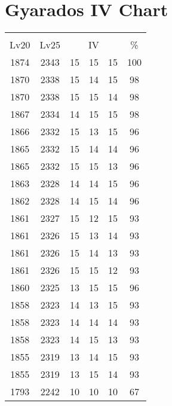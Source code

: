 \documentclass{article}%
\begin{document}
%
\normalsize%
\section{Gyarados IV Chart}%
\label{sec:Gyarados IV Chart}%
\renewcommand{\arraystretch}{1.5}%
\begin{tabular}{|c|c|c|c|c|c|}%
\hline%
\multicolumn{6}{|c|}{\textcolor{white}{ 
\linebreak{Gyarados}
}%
\cellcolor{black}}\\%
\multicolumn{1}{|c}{Lv20}&\multicolumn{1}{c|}{Lv25}&\multicolumn{3}{c|}{IV}&\multicolumn{1}{|c|}{\%}\\%
\hline%
\rowcolor{color100}%
1874&2343&15&15&15&100\\%
\hline%
\rowcolor{color98}%
1870&2338&15&14&15&98\\%
\hline%
\rowcolor{color98}%
1870&2338&15&15&14&98\\%
\hline%
\rowcolor{color98}%
1867&2334&14&15&15&98\\%
\hline%
\rowcolor{color96}%
1866&2332&15&13&15&96\\%
\hline%
\rowcolor{color96}%
1865&2332&15&14&14&96\\%
\hline%
\rowcolor{color96}%
1865&2332&15&15&13&96\\%
\hline%
\rowcolor{color96}%
1863&2328&14&14&15&96\\%
\hline%
\rowcolor{color96}%
1862&2328&14&15&14&96\\%
\hline%
\rowcolor{color93}%
1861&2327&15&12&15&93\\%
\hline%
\rowcolor{color93}%
1861&2326&15&13&14&93\\%
\hline%
\rowcolor{color93}%
1861&2326&15&14&13&93\\%
\hline%
\rowcolor{color93}%
1861&2326&15&15&12&93\\%
\hline%
\rowcolor{color96}%
1860&2325&13&15&15&96\\%
\hline%
\rowcolor{color93}%
1858&2323&14&13&15&93\\%
\hline%
\rowcolor{color93}%
1858&2323&14&14&14&93\\%
\hline%
\rowcolor{color93}%
1858&2323&14&15&13&93\\%
\hline%
\rowcolor{color93}%
1855&2319&13&14&15&93\\%
\hline%
\rowcolor{color93}%
1855&2319&13&15&14&93\\%
\hline%
\rowcolor{color91}%
1793&2242&10&10&10&67\\%
\end{tabular}

%
\end{document}
